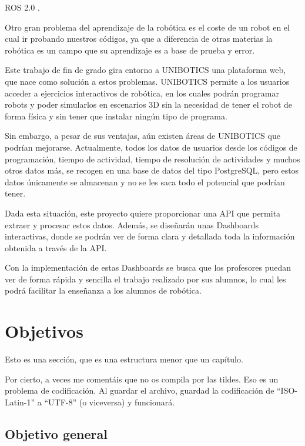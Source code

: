 \documentclass[a4paper, 12pt]{book}
\begin{document}
ROS 2.0 \cite{rico2025concise}.

Otro gran problema del aprendizaje de la robótica es el coste de un robot en el cual ir probando nuestros códigos, ya que a diferencia de otras materias la robótica es un campo que su aprendizaje es a base de prueba y error.

Este trabajo de fin de grado gira entorno a UNIBOTICS una plataforma web, que nace como solución a estos problemas. UNIBOTICS permite a los usuarios acceder a ejercicios interactivos de robótica, en los cuales podrán programar robots y poder simularlos en escenarios 3D sin la necesidad de tener el robot de forma física y sin tener que instalar ningún tipo de programa.

Sin embargo, a pesar de sus ventajas, aún existen áreas de UNIBOTICS que podrían mejorarse. Actualmente, todos los datos de  usuarios desde los códigos de programación, tiempo de actividad, tiempo de resolución de actividades y muchos otros datos más, se recogen en una base de datos del tipo PostgreSQL, pero estos datos únicamente se almacenan y no se les saca todo el potencial que podrían tener.

Dada esta situación, este proyecto quiere proporcionar una API que permita extraer y procesar estos datos. Además, se diseñarán unas Dashboards interactivas, donde se podrán ver de forma clara y detallada toda la información obtenida a través de la API.

Con la implementación de estas Dashboards se busca que los profesores puedan ver de forma rápida y sencilla el trabajo realizado por sus alumnos, lo cual les podrá facilitar la enseñanza a los alumnos de robótica.

\section{Objetivos}
\label{sec:seccion}

Esto es una sección, que es una estructura menor que un capítulo. 

Por cierto, a veces me comentáis que no os compila por las tildes.
Eso es un problema de codificación.
Al guardar el archivo, guardad la codificación de ``ISO-Latin-1'' a ``UTF-8'' (o viceversa) y funcionará.

\subsection{Objetivo general} %
\label{sec:objetivo-general} %
\end{document}

